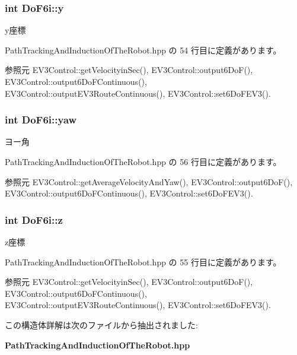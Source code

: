 \subsubsection[{y}]{\setlength{\rightskip}{0pt plus 5cm}int Do\-F6i\-::y}\label{struct_do_f6i_abef9e9a9ee355286d762d0341ad1dc73}


y座標 



 Path\-Tracking\-And\-Induction\-Of\-The\-Robot.\-hpp の 54 行目に定義があります。



参照元 E\-V3\-Control\-::get\-Velocityin\-Sec(), E\-V3\-Control\-::output6\-Do\-F(), E\-V3\-Control\-::output6\-Do\-F\-Continuous(), E\-V3\-Control\-::output\-E\-V3\-Route\-Continuous(), E\-V3\-Control\-::set6\-Do\-F\-E\-V3().

\subsubsection[{yaw}]{\setlength{\rightskip}{0pt plus 5cm}int Do\-F6i\-::yaw}\label{struct_do_f6i_abd423e805d0a6dafe1a5da33b82ec6c8}


ヨー角 



 Path\-Tracking\-And\-Induction\-Of\-The\-Robot.\-hpp の 56 行目に定義があります。



参照元 E\-V3\-Control\-::get\-Average\-Velocity\-And\-Yaw(), E\-V3\-Control\-::output6\-Do\-F(), E\-V3\-Control\-::output6\-Do\-F\-Continuous(), E\-V3\-Control\-::set6\-Do\-F\-E\-V3().

\subsubsection[{z}]{\setlength{\rightskip}{0pt plus 5cm}int Do\-F6i\-::z}\label{struct_do_f6i_a1f4b70d1d46fe9e2f105e2646c644286}


z座標 



 Path\-Tracking\-And\-Induction\-Of\-The\-Robot.\-hpp の 55 行目に定義があります。



参照元 E\-V3\-Control\-::get\-Velocityin\-Sec(), E\-V3\-Control\-::output6\-Do\-F(), E\-V3\-Control\-::output6\-Do\-F\-Continuous(), E\-V3\-Control\-::output\-E\-V3\-Route\-Continuous(), E\-V3\-Control\-::set6\-Do\-F\-E\-V3().



この構造体詳解は次のファイルから抽出されました\-:\begin{DoxyCompactItemize}
\item 
{\bf Path\-Tracking\-And\-Induction\-Of\-The\-Robot.\-hpp}\end{DoxyCompactItemize}
